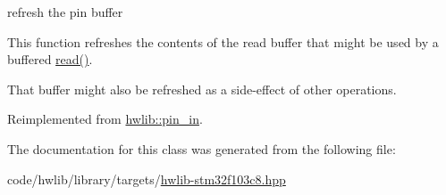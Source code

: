 refresh the pin buffer

This function refreshes the contents of the read buffer that might be used by a buffered \hyperlink{classstm32f103c8_1_1pin__in_aba2e7e6efa14b83d12c30b63f67b9270}{read()}.

That buffer might also be refreshed as a side-\/effect of other operations. 

Reimplemented from \hyperlink{classhwlib_1_1pin__in_a3fb1bfb1ec962bb6d31a5e865f0d0acb}{hwlib\+::pin\+\_\+in}.



The documentation for this class was generated from the following file\+:\begin{DoxyCompactItemize}
\item 
code/hwlib/library/targets/\hyperlink{hwlib-stm32f103c8_8hpp}{hwlib-\/stm32f103c8.\+hpp}\end{DoxyCompactItemize}
